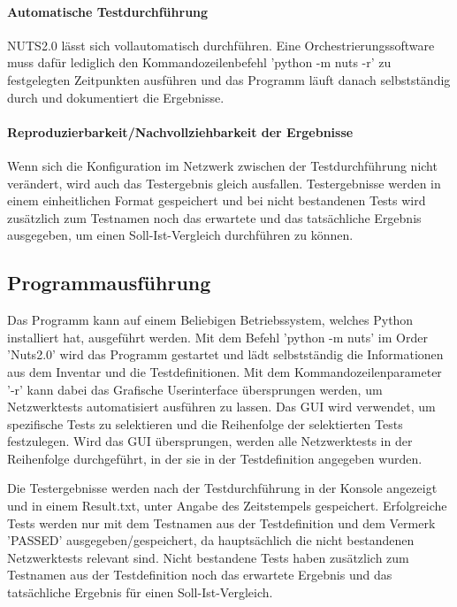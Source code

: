 \documentclass[]{subfiles}
\begin{document}
\paragraph{Automatische Testdurchführung} 
NUTS2.0 lässt sich vollautomatisch durchführen.
Eine Orchestrierungssoftware muss dafür lediglich den Kommandozeilenbefehl
'python -m nuts -r' zu festgelegten Zeitpunkten ausführen und das 
Programm läuft danach selbstständig durch und dokumentiert die Ergebnisse.

\paragraph{Reproduzierbarkeit/Nachvollziehbarkeit der Ergebnisse} 
Wenn sich die Konfiguration im Netzwerk zwischen der Testdurchführung nicht verändert,
wird auch das Testergebnis gleich ausfallen. 
Testergebnisse werden in einem einheitlichen Format gespeichert und bei nicht bestandenen
Tests wird zusätzlich zum Testnamen noch das erwartete und das tatsächliche Ergebnis
ausgegeben, um einen Soll-Ist-Vergleich durchführen zu können.

\subsection{Programmausführung}
Das Programm kann auf einem Beliebigen Betriebssystem, welches Python installiert hat,
ausgeführt werden.
Mit dem Befehl 'python -m nuts' im Order 'Nuts2.0' wird das Programm gestartet und
lädt selbstständig die Informationen aus dem Inventar und die Testdefinitionen.
Mit dem Kommandozeilenparameter '-r' kann dabei das Grafische Userinterface übersprungen
werden, um Netzwerktests automatisiert ausführen zu lassen.
Das GUI wird verwendet, um spezifische Tests zu selektieren und die Reihenfolge der 
selektierten Tests festzulegen.
Wird das GUI übersprungen, werden alle Netzwerktests in der Reihenfolge durchgeführt,
in der sie in der Testdefinition angegeben wurden.

Die Testergebnisse werden nach der Testdurchführung in der Konsole angezeigt und 
in einem Result.txt, unter Angabe des Zeitstempels gespeichert. 
Erfolgreiche Tests werden nur mit dem Testnamen aus der Testdefinition und dem Vermerk
'PASSED' ausgegeben/gespeichert, da hauptsächlich die nicht bestandenen Netzwerktests 
relevant sind.
Nicht bestandene Tests haben zusätzlich zum Testnamen aus der Testdefinition noch das
erwartete Ergebnis und das tatsächliche Ergebnis für einen Soll-Ist-Vergleich.

\newpage
\end{document}
